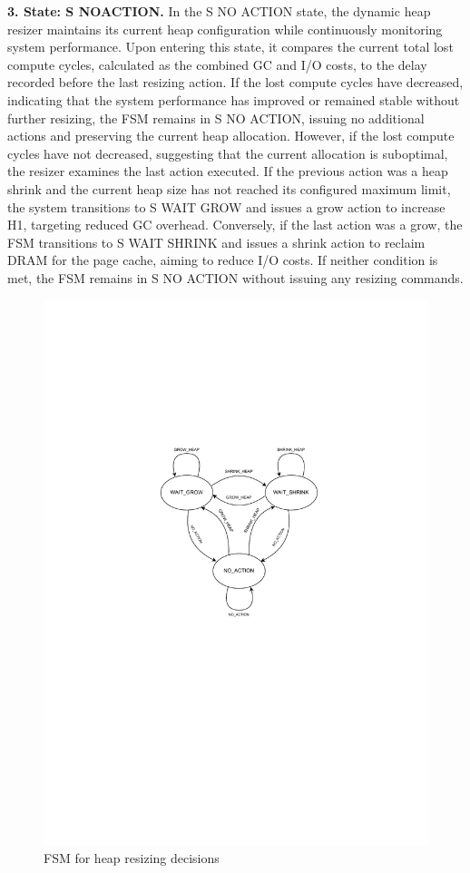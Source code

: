 \textbf{3. State: S NOACTION.} In the S NO ACTION state, the dynamic heap
resizer maintains its current heap configuration while continuously monitoring
system performance. Upon entering this state, it compares the current total lost
compute cycles, calculated as the combined GC and I/O costs, to the delay
recorded before the last resizing action. If the lost compute cycles have
decreased, indicating that the system performance has improved or remained
stable without further resizing, the FSM remains in S NO ACTION, issuing no
additional actions and preserving the current heap allocation. However, if the
lost compute cycles have not decreased, suggesting that the current allocation
is suboptimal, the resizer examines the last action executed. If the previous
action was a heap shrink and the current heap size has not reached its
configured maximum limit, the system transitions to S WAIT GROW and issues a
grow action to increase H1, targeting reduced GC overhead. Conversely, if the
last action was a grow, the FSM transitions to S WAIT SHRINK and issues a shrink
action to reclaim DRAM for the page cache, aiming to reduce I/O costs. If
neither condition is met, the FSM remains in S NO ACTION without issuing any
resizing commands.

\vspace{0.2cm}

\begin{figure}[htbp]
  \centering
\includegraphics[width=1.1\columnwidth]{fig/FSM.pdf}
  \caption{FSM for heap resizing decisions}
  \label{fig:fsm}
\end{figure}

